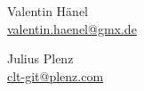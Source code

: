 \documentclass[11pt,            %
               a4paper,         %
               oneside,         %
               DIV12,           %
               fleqn,           %
               smallheadings,   %
               halfparskip,     %
               nochapterprefix, %
               bibtotocnumbered,%
              ]{scrartcl} %
\begin{document}
\hfill
\begin{minipage}{5cm}
\begin{center}
Valentin Hänel\\
\url{valentin.haenel@gmx.de}
\end{center}
\end{minipage}
\hfill
\begin{minipage}{5cm}
\begin{center}
Julius Plenz\\
\url{clt-git@plenz.com}
\end{center}
\end{minipage}
\hfill\\







%
%
\end{document}
